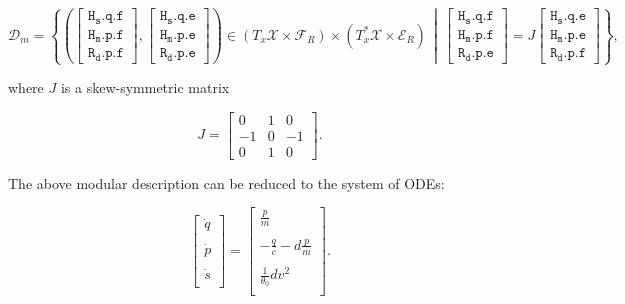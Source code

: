 \documentclass[
	parskip, 			   %
	twoside, 			   %
	DIV=14, 			   %
	BCOR=15.0mm, 		   %
	headsepline, 		   %
	open=right, 		   %
	captions=tableheading, %
	bibliography=totoc,    %
	numbers=noenddot       %
]{scrreprt}
\begin{document}
\begin{equation}
    \label{eq:Dirac_structure_idho}
    \mathcal{D}_m=\left\{ \left( \left[\begin{array}{l}\mathtt{H_{s}.q.f} \\ \mathtt{H_{m}.p.f} \\ \hline \mathtt{R_{d}.p.f} \end{array} \right], \left[\begin{array}{l} \mathtt{H_{s}.q.e} \\ \mathtt{H_{m}.p.e} \\ \hline \mathtt{R_{d}.p.e} \end{array}\right] \right) \in (T_{x}\mathcal{X} \times \mathcal{F}_R) \times (T_{x}^{*}\mathcal{X} \times \mathcal{E}_R)    \,\middle\vert\,    \left[\begin{array}{l}\mathtt{H_{s}.q.f} \\ \mathtt{H_{m}.p.f} \\ \hline \mathtt{R_{d}.p.e}\end{array}\right]=J\left[\begin{array}{l}\mathtt{H_{s}.q.e} \\ \mathtt{H_{m}.p.e} \\ \hline \mathtt{R_{d}.p.f} \end{array}\right]\right\},
\end{equation}

where $J$ is a skew-symmetric matrix

\begin{equation}
    \label{eq:skew-symmetric_matrix_idho}
    J = 
    \left[\begin{array}{rr|r}
    0 & 1 & 0 \\
    -1 & 0 & -1 \\
    \hline 0 & 1 & 0
    \end{array}\right].
\end{equation}

The above modular description can be reduced to the system of ODEs:

\begin{equation}
    \label{eq:ODE_isothermal_damped_harmonic_oscillator}
    \begin{bmatrix}
    \dot{q}\\
    \\
    \dot{p}\\
    \\
    \dot{s}\\
    \end{bmatrix}
    =
    \begin{bmatrix}
    \frac{p}{m}\\
    \\
    -\frac{q}{c}-d\frac{p}{m}\\
    \\
    \frac{1}{\theta_{0}} d v^2\\
    \end{bmatrix}.
\end{equation}
\end{document}
